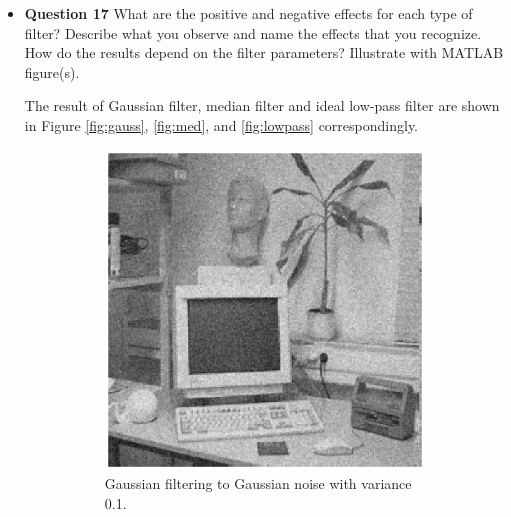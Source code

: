 \documentclass[11pt,a4paper]{article}
\begin{document}
\begin{itemize}
	\item \textbf{Question 17} What are the positive and negative effects for each type of filter? Describe what you observe and name the effects that you recognize. How do the results depend on the filter parameters? Illustrate with MATLAB figure(s).
	\par The result of Gaussian filter, median filter and ideal low-pass filter are shown in Figure \ref{fig:gauss}, \ref{fig:med}, and \ref{fig:lowpass} correspondingly.
	\begin{figure}[!ht]
		\centering 
		\begin{subfigure}[t]{.32\linewidth} %
			\includegraphics[width=\columnwidth]{Q17_Gauss_to_Gauss_0_1.eps}
			\caption{\scriptsize Gaussian filtering to Gaussian noise with variance 0.1.}
			\label{fig:gaussToGauss0.1}
		\end{subfigure}
		\begin{subfigure}[t]{.32\linewidth} %

\end{subfigure}
\end{figure}
\end{itemize}
\end{document}

